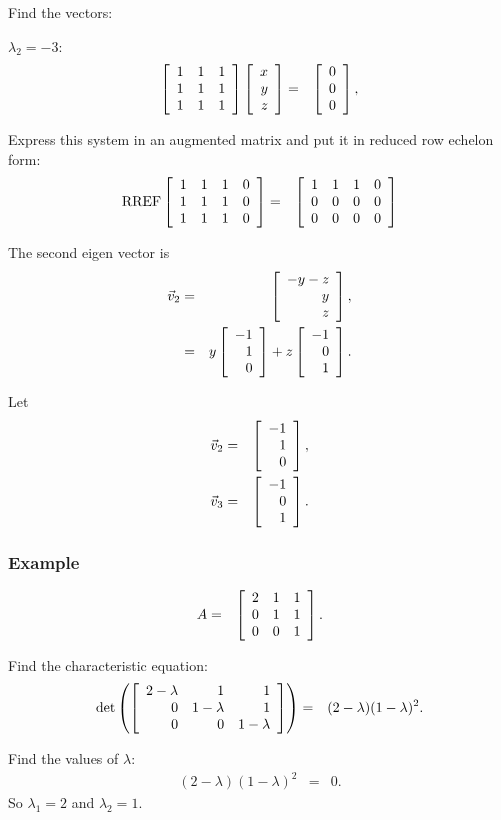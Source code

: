 \begin{frame}
  Find the vectors:

  $\lambda_2 = -3$:
  \begin{eqnarray*}
    \left[ \begin{array}{rrr} 1 & 1 & 1 \\ 1 & 1 & 1 \\ 1 & 1 & 1 \end{array} \right]
    \left[ \begin{array}{r} x \\ y \\ z \end{array} \right] & = & \left[ \begin{array}{r} 0 \\ 0 \\ 0 \end{array} \right], \\
  \end{eqnarray*}

  Express this system in an augmented matrix and put it in reduced row
  echelon form:
  \begin{eqnarray*}
    \mathrm{RREF}\left[ \begin{array}{rrrr}
    1 & 1 & 1 & 0 \\  
    1 & 1 & 1 & 0 \\ 
    1 & 1 & 1 & 0 \\ 
    \end{array} \right]
    & = & 
    \left[ \begin{array}{rrrr}
    1 & 1 & 1 & 0 \\  
    0 & 0 & 0 & 0 \\ 
    0 & 0 & 0 & 0 \\ 
    \end{array} \right]
  \end{eqnarray*}

\end{frame}

\begin{frame}

  The second eigen vector is 
  \begin{eqnarray*}
    \vec{v}_2 & = & \left[ \begin{array}{r} -y-z \\ y \\ z \end{array} \right], \\
    & = & y \left[ \begin{array}{r} -1 \\ 1 \\ 0 \end{array} \right] + z \left[ \begin{array}{r} -1 \\ 0 \\ 1 \end{array} \right].
  \end{eqnarray*}

  Let
  \begin{eqnarray*}
    \vec{v}_2 & = & \left[ \begin{array}{r} -1 \\ 1 \\ 0 \end{array} \right], \\
    \vec{v}_3 & = & \left[ \begin{array}{r} -1 \\ 0 \\ 1 \end{array} \right].
  \end{eqnarray*}

\end{frame}



\begin{frame}
  \frametitle{Example}

  \begin{eqnarray*}
    A & = & \left[ \begin{array}{rrr} 2 & 1 & 1 \\ 0 & 1 & 1 \\ 0 & 0 & 1 \end{array} \right].
  \end{eqnarray*}

  Find the characteristic equation:
  \begin{eqnarray*}
    \det\left(\left[ \begin{array}{rrr} 2-\lambda & 1 & 1 \\ 0 & 1-\lambda & 1 \\ 0 & 0 & 1-\lambda \end{array} \right]\right)
    & = & (2-\lambda) (1-\lambda)^2.
  \end{eqnarray*}

  Find the values of $\lambda$:
  \begin{eqnarray*}
    (2-\lambda) (1-\lambda)^2 & = & 0.
  \end{eqnarray*}
  So $\lambda_1 = 2$ and $\lambda_2=1$.


\end{frame}


